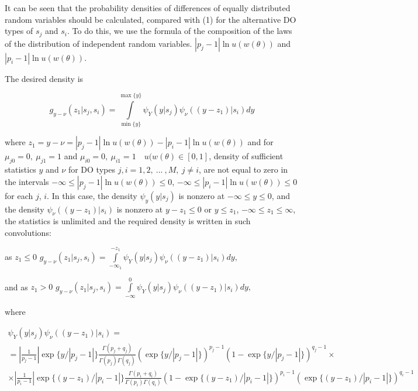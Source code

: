 It can be seen that the probability densities of differences of equally distributed random variables should be calculated, compared with (1) for the alternative DO types of  ${{s}_{j}}$ and ${{s}_{i}}$. To do this, we use the formula of the composition of the laws of the distribution of independent random variables. $\left| {{p}_{j}}-1 \right|\ln u(w(\theta ))$ and $\left| {{p}_{i}}-1 \right|\ln u(w(\theta ))$.

The desired density is

\begin{equation*}
{{g}_{y-\nu }}({{z}_{1}}|{{s}_{j}},{{s}_{i}})=\int\limits_{\min \{y\}}^{\max \{y\}}{{{\psi }_{Y}}(y|{{s}_{j}}){{\psi }_{\nu }}((y-{{z}_{1}})|{{s}_{i}})dy}
\end{equation*}

where ${{z}_{1}}=y-\nu =\left| {{p}_{j}}-1 \right|\ln u(w(\theta ))-\left| {{p}_{i}}-1 \right|\ln u(w(\theta ))$ and for ${{\mu }_{j0}}=0,\ {{\mu }_{j1}}=1$ and ${{\mu }_{i0}}=0,\ {{\mu }_{i1}}=1\quad u(w(\theta )\in \left[ 0,1 \right]$, density of sufficient statistics $y$ and $\nu $ for DO types $j,i=1,2,\ ...\ ,M,\ j\ne i$, are not equal to zero in the intervals $-\infty \le \left| {{p}_{j}}-1 \right|\ln u(w(\theta ))\le 0$, $-\infty \le \left| {{p}_{i}}-1 \right|\ln u(w(\theta ))\le 0$ for each $j$, $i$. In this case, the density ${{\psi }_{y}}(y|{{s}_{j}})$ is nonzero at $-\infty \le y\le 0$, and the density ${{\psi }_{\nu }}((y-{{z}_{1}})|{{s}_{i}})$ is nonzero at $y-{{z}_{1}}\le 0$ or $y\le {{z}_{1}}$, $-\infty \le {{z}_{1}}\le \infty $, the statistics is unlimited and the required density is written in such convolutions:

as ${{z}_{1}}\le 0$ ${{g}_{y-\nu }}({{z}_{1}}|{{s}_{j}},{{s}_{i}})=\int\limits_{-{{\infty }_{1}}}^{-{{z}_{1}}}{{{\psi }_{Y}}(y|{{s}_{j}}){{\psi }_{\nu }}((y-{{z}_{1}})|{{s}_{i}})dy},$

and as ${{z}_{1}}>0$ ${{g}_{y-\nu }}({{z}_{1}}|{{s}_{j}},{{s}_{i}})=\int\limits_{-\infty }^{0}{{{\psi }_{Y}}(y|{{s}_{j}}){{\psi }_{\nu }}((y-{{z}_{1}})|{{s}_{i}})dy},$

where 

\begin{equation*}
\begin{gathered}
 {{\psi }_{Y}}(y|{{s}_{j}}){{\psi }_{\nu }}((y-{{z}_{1}})|{{s}_{i}})= \\ 
  =\left| \frac{1}{{{p}_{j}}-1} \right|\exp \{y/\left| {{p}_{j}}-1 \right|\}\frac{\Gamma ({{p}_{j}}+{{q}_{j}})}{\Gamma ({{p}_{j}})\Gamma ({{q}_{j}})}{{\left( \exp \{y/\left| {{p}_{j}}-1 \right|\} \right)}^{{{p}_{j}}-1}}{{\left( 1-\exp \{y/\left| {{p}_{j}}-1 \right|\} \right)}^{{{q}_{j}}-1}}\times  \\ 
  \times \left| \frac{1}{{{p}_{i}}-1} \right|\exp \{(y-{{z}_{1}})/\left| {{p}_{i}}-1 \right|\}\frac{\Gamma ({{p}_{i}}+{{q}_{i}})}{\Gamma ({{p}_{i}})\Gamma ({{q}_{i}})}{{\left( 1-\exp \{(y-{{z}_{1}})/\left| {{p}_{i}}-1 \right|\} \right)}^{{{p}_{i}}-1}}{{\left( \exp \{(y-{{z}_{1}})/\left| {{p}_{i}}-1 \right|\} \right)}^{{{q}_{i}}-1}}
\end{gathered}
\end{equation*}

